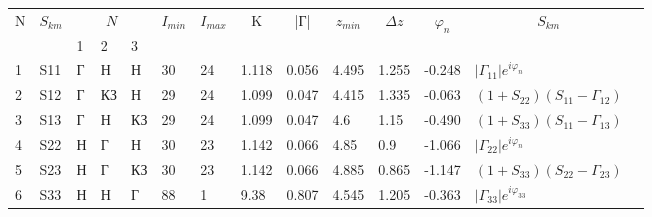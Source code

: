 
\begin{tabular}{|l|l|l|l|l|l|l|l|l|l|l|l|l|l}
\cline{1-13}
\multicolumn{1}{|c|}{\multirow{2}{*}{N}} & \multicolumn{1}{c|}{\multirow{2}{*}{$S_{km}$}} & \multicolumn{3}{c|}{$N_{}$} & \multicolumn{1}{c|}{\multirow{2}{*}{$I_{min}$}} & \multicolumn{1}{c|}{\multirow{2}{*}{$I_{max}$}} & \multicolumn{1}{c|}{\multirow{2}{*}{K}} & \multicolumn{1}{c|}{\multirow{2}{*}{|Г|}} & \multicolumn{1}{c|}{\multirow{2}{*}{$z_{min}$}} & \multicolumn{1}{c|}{\multirow{2}{*}{$\Delta z$}} & \multicolumn{1}{c|}{\multirow{2}{*}{$\varphi_n$}} & \multicolumn{1}{c|}{\multirow{2}{*}{$S_{km}$}} &  \\ \cline{3-5}
\multicolumn{1}{|c|}{} & \multicolumn{1}{c|}{}  & 1& 2 & 3& \multicolumn{1}{c|}{}   & \multicolumn{1}{c|}{}   & \multicolumn{1}{c|}{} & \multicolumn{1}{c|}{}   & \multicolumn{1}{c|}{}   & \multicolumn{1}{c|}{}    & \multicolumn{1}{c|}{}     & \multicolumn{1}{c|}{}  &  \\ \cline{1-13}

1& S11    & Г& Н & Н& 30& 24& 1.118     & 0.056 & 4.495   & 1.255   & -0.248  &$|\Gamma_{11}|e^{i\varphi_n}$     &  \\ \cline{1-13}
2& S12    & Г& КЗ& Н& 29& 24& 1.099     & 0.047 & 4.415   & 1.335   & -0.063  &$(1+S_{22})(S_{11}-\Gamma_{12})$  &  \\ \cline{1-13}
3& S13    & Г& Н &КЗ& 29& 24& 1.099     & 0.047 & 4.6     & 1.15    & -0.490  &$(1+S_{33})(S_{11}-\Gamma_{13})$  &  \\ \cline{1-13}
4& S22    & Н& Г & Н& 30& 23& 1.142     & 0.066 & 4.85    & 0.9     & -1.066  &$|\Gamma_{22}|e^{i\varphi_n}$     &  \\ \cline{1-13}
5& S23    & Н& Г &КЗ& 30& 23& 1.142     & 0.066 & 4.885   & 0.865   & -1.147  &$(1+S_{33})(S_{22}-\Gamma_{23})$  &  \\ \cline{1-13}
6& S33    & Н& Н & Г& 88& 1 & 9.38      & 0.807 & 4.545   & 1.205   & -0.363  &$|\Gamma_{33}|e^{i\varphi_{33}}$  &  \\ \cline{1-13}
\end{tabular}

